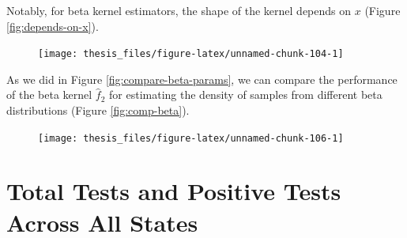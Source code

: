 \documentclass[12pt,twoside]{smiththesis}
\begin{document}
Notably, for beta kernel estimators, the shape of the kernel depends on \(x\) (Figure \ref{fig:depends-on-x}).
\begin{figure}

{\centering \texttt{[image: thesis\_files/figure-latex/unnamed-chunk-104-1]} 

}

\caption{\label{fig:depends-on-x}}\label{fig:unnamed-chunk-104}
\end{figure}
As we did in Figure \ref{fig:compare-beta-params}, we can compare the performance of the beta kernel \(\hat f_2\) for estimating the density of samples from different beta distributions (Figure \ref{fig:comp-beta}).
\begin{figure}

{\centering \texttt{[image: thesis\_files/figure-latex/unnamed-chunk-106-1]} 

}

\caption{\label{fig:comp-beta}}\label{fig:unnamed-chunk-106}
\end{figure}
\hypertarget{total-tests-and-positive-tests-across-all-states}{%
\section{Total Tests and Positive Tests Across All States}\label{total-tests-and-positive-tests-across-all-states}}
\end{document}

